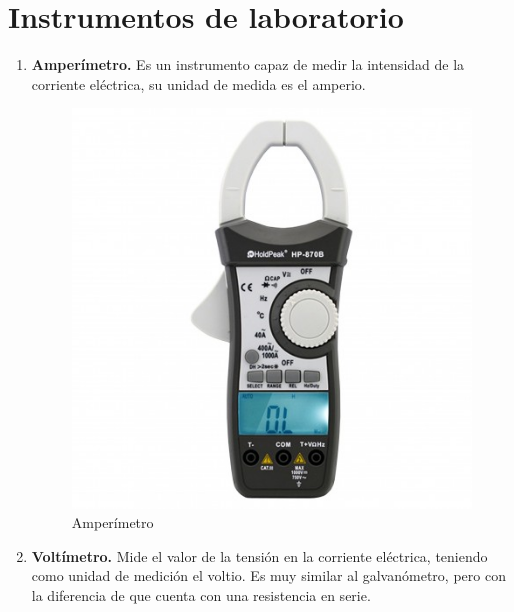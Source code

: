 \documentclass[a4paper,12pt]{report}
\begin{document}
\chapter{Instrumentos de laboratorio}
\begin{enumerate}
\item \textbf{Amperímetro.} Es un instrumento capaz de medir la intensidad de la corriente eléctrica, su unidad de medida es el amperio.
\begin{figure}[H]
\begin{center}
\includegraphics[scale=0.27]{amperimetro.jpg}
\caption{Amperímetro}
\end{center}
\end{figure}
\item \textbf{Voltímetro.} Mide el valor de la tensión en la corriente eléctrica, teniendo como unidad de medición el voltio. Es muy similar al galvanómetro, pero con la diferencia de que cuenta con una resistencia en serie.
\begin{figure}[H]
\begin{center}

\end{center}
\end{figure}
\end{enumerate}
\end{document}
